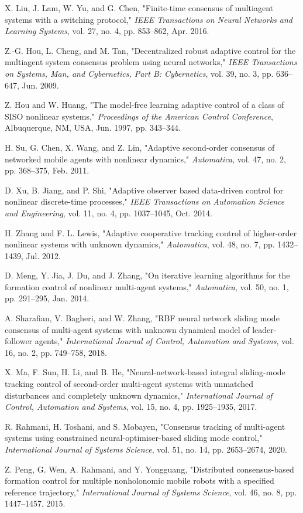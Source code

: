 \documentclass[journal,onecolumn]{IEEEtran}
\begin{document}
\begin{thebibliography}{99}
    X. Liu, J. Lam, W. Yu, and G. Chen, "Finite-time consensus of multiagent systems with a switching protocol," \emph{IEEE Transactions on Neural Networks and Learning Systems}, vol. 27, no. 4, pp. 853–862, Apr. 2016.
    
    Z.-G. Hou, L. Cheng, and M. Tan, "Decentralized robust adaptive control for the multiagent system consensus problem using neural networks," \emph{IEEE Transactions on Systems, Man, and Cybernetics, Part B: Cybernetics}, vol. 39, no. 3, pp. 636–647, Jun. 2009.
    
    Z. Hou and W. Huang, "The model-free learning adaptive control of a class of SISO nonlinear systems," \emph{Proceedings of the American Control Conference}, Albuquerque, NM, USA, Jun. 1997, pp. 343–344.
    
    H. Su, G. Chen, X. Wang, and Z. Lin, "Adaptive second-order consensus of networked mobile agents with nonlinear dynamics," \emph{Automatica}, vol. 47, no. 2, pp. 368–375, Feb. 2011.
    
    D. Xu, B. Jiang, and P. Shi, "Adaptive observer based data-driven control for nonlinear discrete-time processes," \emph{IEEE Transactions on Automation Science and Engineering}, vol. 11, no. 4, pp. 1037–1045, Oct. 2014.
    
    H. Zhang and F. L. Lewis, "Adaptive cooperative tracking control of higher-order nonlinear systems with unknown dynamics," \emph{Automatica}, vol. 48, no. 7, pp. 1432–1439, Jul. 2012.
    
    D. Meng, Y. Jia, J. Du, and J. Zhang, "On iterative learning algorithms for the formation control of nonlinear multi-agent systems," \emph{Automatica}, vol. 50, no. 1, pp. 291–295, Jan. 2014.

    A. Sharafian, V. Bagheri, and W. Zhang, "RBF neural network sliding mode consensus of multi-agent systems with unknown dynamical model of leader-follower agents," \textit{International Journal of Control, Automation and Systems}, vol. 16, no. 2, pp. 749–758, 2018.

    X. Ma, F. Sun, H. Li, and B. He, "Neural-network-based integral sliding-mode tracking control of second-order multi-agent systems with unmatched disturbances and completely unknown dynamics," \textit{International Journal of Control, Automation and Systems}, vol. 15, no. 4, pp. 1925–1935, 2017.

    R. Rahmani, H. Toshani, and S. Mobayen, "Consensus tracking of multi-agent systems using constrained neural-optimiser-based sliding mode control," \textit{International Journal of Systems Science}, vol. 51, no. 14, pp. 2653–2674, 2020.

    Z. Peng, G. Wen, A. Rahmani, and Y. Yongguang, "Distributed consensus-based formation control for multiple nonholonomic mobile robots with a specified reference trajectory," \textit{International Journal of Systems Science}, vol. 46, no. 8, pp. 1447–1457, 2015.
    
    \end{thebibliography}
    
\end{document}
